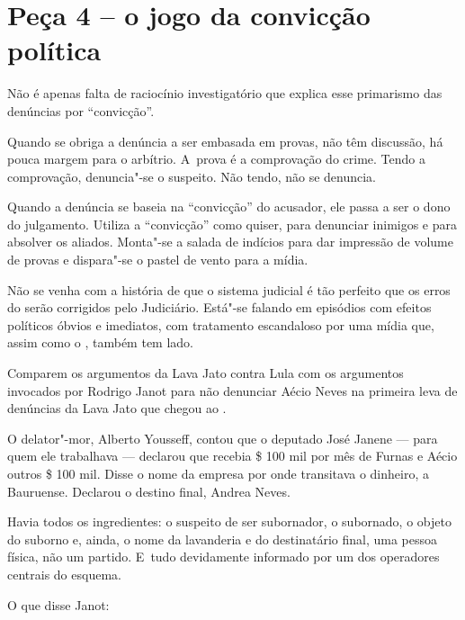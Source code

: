 \section{Peça 4 -- o jogo da convicção política}

Não é apenas falta de raciocínio investigatório que explica esse
primarismo das denúncias por ``convicção''.

Quando se obriga a denúncia a ser embasada em provas, não têm discussão,
há pouca margem para o arbítrio. A~prova é a comprovação do crime. Tendo
a comprovação, denuncia"-se o suspeito. Não tendo, não se denuncia.

Quando a denúncia se baseia na ``convicção'' do acusador, ele passa a
ser o dono do julgamento. Utiliza a ``convicção'' como quiser, para
denunciar inimigos e para absolver os aliados. Monta"-se a salada de
indícios para dar impressão de volume de provas e dispara"-se o pastel de
vento para a mídia.

Não se venha com a história de que o sistema judicial é tão perfeito que
os erros do  serão corrigidos pelo Judiciário. Está"-se falando em
episódios com efeitos políticos óbvios e imediatos, com tratamento
escandaloso por uma mídia que, assim como o , também tem lado.

Comparem os argumentos da Lava Jato contra Lula com os argumentos
invocados por Rodrigo Janot para não denunciar Aécio Neves na primeira
leva de denúncias da Lava Jato que chegou ao .

O delator"-mor, Alberto Yousseff, contou que o deputado José Janene ---
para quem ele trabalhava --- declarou que recebia \$ 100 mil por mês
de Furnas e Aécio outros \$ 100 mil. Disse o nome da empresa por onde
transitava o dinheiro, a Bauruense. Declarou o destino final, Andrea
Neves.

Havia todos os ingredientes: o suspeito de ser subornador, o subornado,
o objeto do suborno e, ainda, o nome da lavanderia e do destinatário
final, uma pessoa física, não um partido. E~tudo devidamente informado
por um dos operadores centrais do esquema.

O que disse Janot:

